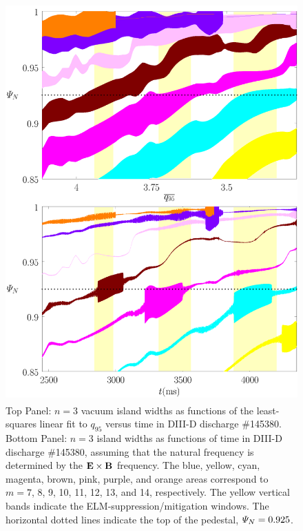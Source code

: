 \documentclass[12pt,prb,aps]{revtex4-1}
\begin{document}
\begin{figure}
\includegraphics[height=6in]{fig9.pdf}
\caption{Top Panel: $n=3$ vacuum island widths as functions of the least-squares linear fit to $q_{95}$ versus time
in   DIII-D discharge \#145380.
Bottom Panel:  $n=3$ island widths as functions of time
in   DIII-D discharge \#145380, assuming that the natural frequency is  determined by the ${\bf E}\times {\bf B}$
frequency. The blue, yellow, cyan, magenta, brown, pink,
purple, and orange  areas correspond to $m=7$, 8, 9, 10, 11, 12, 13, and 14, respectively. The yellow vertical bands indicate the ELM-suppression/mitigation windows. 
The horizontal dotted lines indicate the top of the pedestal, ${\mit\Psi}_N=0.925$.} \label{fig9}
\end{figure}
\end{document}
